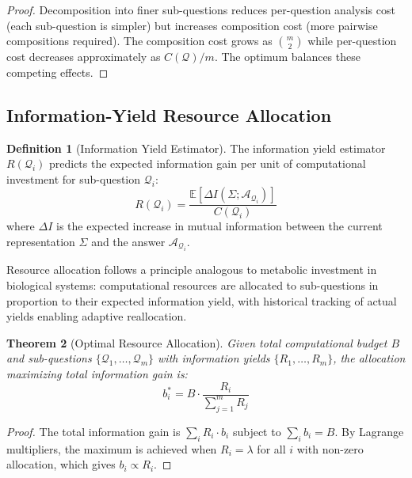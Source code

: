 \documentclass[10pt,twocolumn]{article}
\newtheorem{theorem}{Theorem}[section]
\theoremstyle{definition}
\newtheorem{definition}[theorem]{Definition}
\theoremstyle{remark}
\newcommand{\question}{\mathcal{Q}}
\newcommand{\answer}{\mathcal{A}}
\begin{document}
\begin{proof}
Decomposition into finer sub-questions reduces per-question analysis cost (each sub-question is simpler) but increases composition cost (more pairwise compositions required). The composition cost grows as $\binom{m}{2}$ while per-question cost decreases approximately as $C(\question)/m$. The optimum balances these competing effects.
\end{proof}

\subsection{Information-Yield Resource Allocation}

\begin{definition}[Information Yield Estimator]
The information yield estimator $R(\question_i)$ predicts the expected information gain per unit of computational investment for sub-question $\question_i$:
\begin{equation}
R(\question_i) = \frac{\mathbb{E}[\Delta I(\Sigma; \answer_{\question_i})]}{C(\question_i)}
\end{equation}
where $\Delta I$ is the expected increase in mutual information between the current representation $\Sigma$ and the answer $\answer_{\question_i}$.
\end{definition}

Resource allocation follows a principle analogous to metabolic investment in biological systems: computational resources are allocated to sub-questions in proportion to their expected information yield, with historical tracking of actual yields enabling adaptive reallocation.

\begin{theorem}[Optimal Resource Allocation]
\label{thm:resource_allocation}
Given total computational budget $B$ and sub-questions $\{\question_1, \ldots, \question_m\}$ with information yields $\{R_1, \ldots, R_m\}$, the allocation maximizing total information gain is:
\begin{equation}
b_i^* = B \cdot \frac{R_i}{\sum_{j=1}^{m} R_j}
\end{equation}
\end{theorem}

\begin{proof}
The total information gain is $\sum_i R_i \cdot b_i$ subject to $\sum_i b_i = B$. By Lagrange multipliers, the maximum is achieved when $R_i = \lambda$ for all $i$ with non-zero allocation, which gives $b_i \propto R_i$.
\end{proof}
\end{document}
